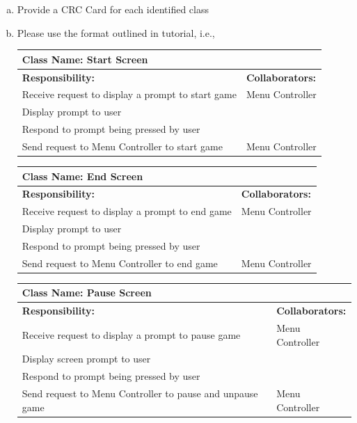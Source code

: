 \documentclass[12pt, titlepage]{article}
\begin{document}
\begin{enumerate}[a)]
	\item Provide a CRC Card for each identified class
	\item Please use the format outlined in tutorial, i.e., 

	\begin{table}[H]
		\centering
		\begin{tabular}{|p{10cm}|p{5cm}|}
		\hline 
		 \multicolumn{2}{|l|}{\textbf{Class Name: Start Screen}} \\
		\hline
		\textbf{Responsibility:} & \textbf{Collaborators:} \\
		\hline
		 Receive request to display a prompt to start game& Menu Controller \\
		\hline
		 Display prompt to user& \\
		\hline
		 Respond to prompt being pressed by user& \\
		\hline
		 Send request to Menu Controller to start game& Menu Controller \\
		\hline
		\end{tabular}
	\end{table}
	
	\begin{table}[H]
		\centering
		\begin{tabular}{|p{10cm}|p{5cm}|}
		\hline 
		 \multicolumn{2}{|l|}{\textbf{Class Name: End Screen}} \\
		\hline
		\textbf{Responsibility:} & \textbf{Collaborators:} \\
		\hline
		 Receive request to display a prompt to end game& Menu Controller \\
		\hline
		 Display prompt to user& \\
		\hline
		 Respond to prompt being pressed by user& \\
		\hline
		 Send request to Menu Controller to end game& Menu Controller \\
		\hline
		\end{tabular}
	\end{table}
	
	\begin{table}[H]
		\centering
		\begin{tabular}{|p{10cm}|p{5cm}|}
		\hline 
		 \multicolumn{2}{|l|}{\textbf{Class Name: Pause Screen}} \\
		\hline
		\textbf{Responsibility:} & \textbf{Collaborators:} \\
		\hline
		 Receive request to display a prompt to pause game& Menu Controller \\
		\hline
		 Display screen prompt to user& \\
		\hline
		 Respond to prompt being pressed by user& \\
		\hline
		 Send request to Menu Controller to pause and unpause game& Menu Controller \\
		\hline
		\end{tabular}
	\end{table}
	

\end{enumerate}
\end{document}
